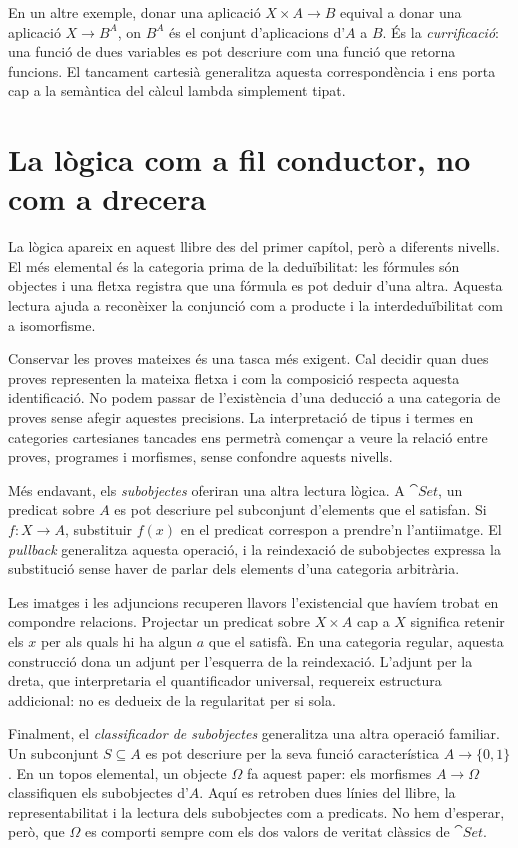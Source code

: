 En un altre exemple, donar una aplicació $X\times A\to B$ equival a
donar una aplicació $X\to B^A$, on $B^A$ és el conjunt d'aplicacions
d'$A$ a $B$. És la \emph{currificació}: una funció de dues variables
es pot descriure com una funció que retorna funcions. El tancament
cartesià generalitza aquesta correspondència i ens porta cap a la
semàntica del càlcul lambda simplement tipat.

\section{La lògica com a fil conductor, no com a drecera}

La lògica apareix en aquest llibre des del primer capítol, però a
diferents nivells. El més elemental és la categoria prima de la
deduïbilitat: les fórmules són objectes i una fletxa registra que una
fórmula es pot deduir d'una altra. Aquesta lectura ajuda a reconèixer
la conjunció com a producte i la interdeduïbilitat com a isomorfisme.

Conservar les proves mateixes és una tasca més exigent. Cal decidir
quan dues proves representen la mateixa fletxa i com la composició
respecta aquesta identificació. No podem passar de l'existència d'una
deducció a una categoria de proves sense afegir aquestes precisions.
La interpretació de tipus i termes en categories cartesianes tancades
ens permetrà començar a veure la relació entre proves, programes i
morfismes, sense confondre aquests nivells.

Més endavant, els \emph{subobjectes} oferiran una altra lectura lògica.
A $\cat{Set}$, un predicat sobre $A$ es pot descriure pel subconjunt
d'elements que el satisfan. Si $f\colon X\to A$, substituir $f(x)$
en el predicat correspon a prendre'n l'antiimatge. El \emph{pullback}
generalitza aquesta operació, i la reindexació de subobjectes expressa
la substitució sense haver de parlar dels elements d'una categoria
arbitrària.

Les imatges i les adjuncions recuperen llavors l'existencial que havíem
trobat en compondre relacions. Projectar un predicat sobre $X\times A$
cap a $X$ significa retenir els $x$ per als quals hi ha algun $a$ que
el satisfà. En una categoria regular, aquesta construcció dona un
adjunt per l'esquerra de la reindexació. L'adjunt per la dreta, que
interpretaria el quantificador universal, requereix estructura
addicional: no es dedueix de la regularitat per si sola.

Finalment, el \emph{classificador de subobjectes} generalitza una altra
operació familiar. Un subconjunt $S\subseteq A$ es pot descriure per
la seva funció característica $A\to\{0,1\}$. En un topos elemental,
un objecte $\Omega$ fa aquest paper: els morfismes $A\to\Omega$
classifiquen els subobjectes d'$A$. Aquí es retroben dues línies del
llibre, la representabilitat i la lectura dels subobjectes com a
predicats. No hem d'esperar, però, que $\Omega$ es comporti sempre
com els dos valors de veritat clàssics de $\cat{Set}$.

